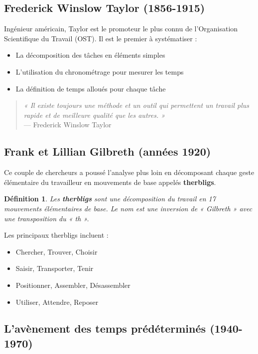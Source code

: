 \documentclass[a4paper,12pt]{article}
\newtheorem{definition}{Définition}[section]
\begin{document}
\subsection{Frederick Winslow Taylor (1856-1915)}

Ingénieur américain, Taylor est le promoteur le plus connu de l'Organisation Scientifique du Travail (OST). Il est le premier à systématiser :

\begin{itemize}
    \item La décomposition des tâches en éléments simples
    \item L'utilisation du chronométrage pour mesurer les temps
    \item La définition de temps alloués pour chaque tâche
\end{itemize}

\begin{quote}
\textit{« Il existe toujours une méthode et un outil qui permettent un travail plus rapide et de meilleure qualité que les autres. »} \\
— Frederick Winslow Taylor
\end{quote}

\subsection{Frank et Lillian Gilbreth (années 1920)}

Ce couple de chercheurs a poussé l'analyse plus loin en décomposant chaque geste élémentaire du travailleur en mouvements de base appelés \textbf{therbligs}.

\begin{definition}
Les \textbf{therbligs} sont une décomposition du travail en 17 mouvements élémentaires de base. Le nom est une inversion de « Gilbreth » avec une transposition du « th ».
\end{definition}

Les principaux therbligs incluent :
\begin{itemize}
    \item Chercher, Trouver, Choisir
    \item Saisir, Transporter, Tenir
    \item Positionner, Assembler, Désassembler
    \item Utiliser, Attendre, Reposer
\end{itemize}

\subsection{L'avènement des temps prédéterminés (1940-1970)}
\end{document}
